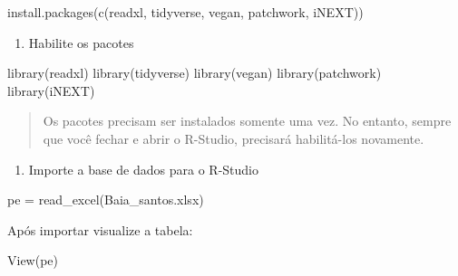 \documentclass[
]{book}
\newenvironment{Shaded}{\begin{snugshade}}{\end{snugshade}}
\newcommand{\FunctionTok}[1]{\textcolor[rgb]{0.00,0.00,0.00}{#1}}
\newcommand{\NormalTok}[1]{#1}
\newcommand{\OtherTok}[1]{\textcolor[rgb]{0.56,0.35,0.01}{#1}}
\newcommand{\StringTok}[1]{\textcolor[rgb]{0.31,0.60,0.02}{#1}}
\providecommand{\tightlist}{%
  \setlength{\itemsep}{0pt}\setlength{\parskip}{0pt}}
\begin{document}
\begin{Shaded}
\begin{Highlighting}[]
\FunctionTok{install.packages}\NormalTok{(}\FunctionTok{c}\NormalTok{(}\StringTok{\textquotesingle{}readxl\textquotesingle{}}\NormalTok{, }\StringTok{\textquotesingle{}tidyverse\textquotesingle{}}\NormalTok{, }\StringTok{\textquotesingle{}vegan\textquotesingle{}}\NormalTok{, }\StringTok{\textquotesingle{}patchwork\textquotesingle{}}\NormalTok{, }\StringTok{\textquotesingle{}iNEXT\textquotesingle{}}\NormalTok{))}
\end{Highlighting}
\end{Shaded}

\begin{enumerate}
\def\labelenumi{\arabic{enumi}.}
\setcounter{enumi}{3}
\tightlist
\item
  Habilite os pacotes
\end{enumerate}

\begin{Shaded}
\begin{Highlighting}[]
\FunctionTok{library}\NormalTok{(readxl)}
\FunctionTok{library}\NormalTok{(tidyverse)}
\FunctionTok{library}\NormalTok{(vegan)}
\FunctionTok{library}\NormalTok{(patchwork)}
\FunctionTok{library}\NormalTok{(iNEXT)}
\end{Highlighting}
\end{Shaded}

\begin{quote}
Os pacotes precisam ser instalados somente uma vez. No entanto, sempre que você fechar e abrir o R-Studio, precisará habilitá-los novamente.
\end{quote}

\begin{enumerate}
\def\labelenumi{\arabic{enumi}.}
\setcounter{enumi}{4}
\tightlist
\item
  Importe a base de dados para o R-Studio
\end{enumerate}

\begin{Shaded}
\begin{Highlighting}[]
\NormalTok{pe }\OtherTok{=} \FunctionTok{read\_excel}\NormalTok{(}\StringTok{\textquotesingle{}Baia\_santos.xlsx\textquotesingle{}}\NormalTok{)}
\end{Highlighting}
\end{Shaded}

Após importar visualize a tabela:

\begin{Shaded}
\begin{Highlighting}[]
\FunctionTok{View}\NormalTok{(pe)}
\end{Highlighting}
\end{Shaded}
\end{document}
